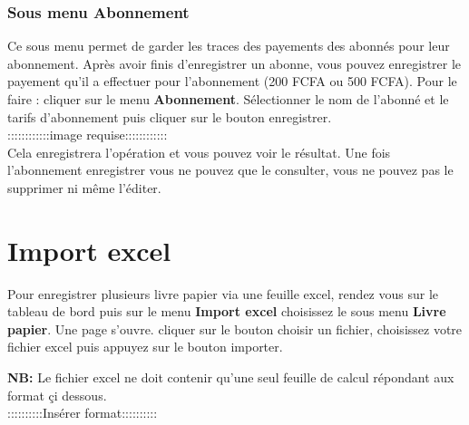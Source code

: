 \documentclass[12pt,a4paper]{article}
\begin{document}
\subsubsection{Sous menu \textbf{Abonnement}}
Ce sous menu permet de garder les traces des payements des abonnés pour leur
abonnement. Après avoir finis d'enregistrer un abonne, vous pouvez enregistrer le 
payement qu'il a effectuer pour l'abonnement (200 FCFA ou 500 FCFA). Pour le faire :
cliquer sur le menu \textbf{Abonnement}. Sélectionner le nom de l'abonné et le tarifs
d'abonnement puis cliquer sur le bouton enregistrer.\\
::::::::::::image requise::::::::::::\\
Cela enregistrera l'opération et vous pouvez voir le résultat. Une fois l'abonnement
enregistrer vous ne pouvez que le consulter, vous ne pouvez pas le supprimer ni même
l'éditer.

\section{Import excel}
Pour enregistrer plusieurs livre papier via une feuille excel, rendez vous sur le
tableau de bord puis sur le menu \textbf{Import excel} choisissez le sous menu 
\textbf{Livre papier}. Une page s'ouvre. cliquer sur le bouton choisir un fichier,
choisissez votre fichier excel puis appuyez sur le bouton importer. 

\textbf{NB:} Le fichier excel ne doit contenir qu'une seul feuille de calcul répondant
aux format çi dessous.\\
::::::::::Insérer format::::::::::
\end{document}
